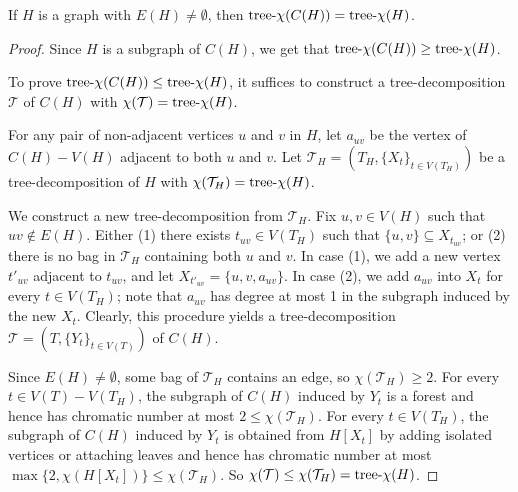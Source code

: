 \documentclass[a4paper, cleveref, autoref, thm-restate]{lipics-v2021}
\newcommand{\T}{\mathcal{T}}
\newcommand{\treex}{{\rm tree}\textnormal{-}\chi}
\begin{document}
\begin{lemma}\label{lemma:completion-treex}
    If $H$ is a graph with $E(H) \neq \emptyset$, then $\treex(C(H)) = \treex(H)$.
\end{lemma}
% 
\begin{proof}
    Since $H$ is a subgraph of $C(H)$, we get that $\treex(C(H))\geq \treex(H)$. %
    
    To prove $\treex(C(H))\leq \treex(H)$, it suffices to construct a tree-decomposition $\T$ of $C(H)$ with $\chi(\T) = \treex(H)$.

    For any pair of non-adjacent vertices $u$ and $v$ in $H$, let $a_{uv}$ be the vertex of $C(H)-V(H)$ adjacent to both $u$ and $v$.
    Let $\T_H = (T_H, \{X_t\}_{t\in V(T_H)})$ be a tree-decomposition of $H$ with $\chi(\T_H) = \treex(H)$. 
    

    We construct a new tree-decomposition from $\T_H$.
    Fix $u, v \in V(H)$ such that $uv \notin E(H)$.
    Either (1) there exists $t_{uv} \in V(T_H)$ such that $\{u,v\} \subseteq X_{t_{uv}}$; or (2) there is no bag in $\T_H$ containing both $u$ and $v$.
    In case (1), we add a new vertex $t'_{uv}$ adjacent to $t_{uv}$, and let $X_{t'_{uv}}=\{u,v,a_{uv}\}$.
    In case (2), we add $a_{uv}$ into $X_t$ for every $t \in V(T_H)$; note that $a_{uv}$ has degree at most 1 in the subgraph induced by the new $X_t$. 
    Clearly, this procedure yields a tree-decomposition $\T = (T, \{Y_t\}_{t \in V(T)})$ of $C(H)$.

    Since $E(H) \neq \emptyset$, some bag of $\T_H$ contains an edge, so $\chi(\T_H) \geq 2$.
    For every $t \in V(T)-V(T_H)$, the subgraph of $C(H)$ induced by $Y_t$ is a forest and hence has chromatic number at most $2 \leq \chi(\T_H)$.
    For every $t \in V(T_H)$, the subgraph of $C(H)$ induced by $Y_t$ is obtained from $H[X_t]$ by adding isolated vertices or attaching leaves and hence has chromatic number at most $\max\{2,\chi(H[X_t])\} \leq \chi(\T_H)$.
    So $\chi(\T) \leq \chi(\T_H) = \treex(H)$.
\end{proof}
\end{document}

